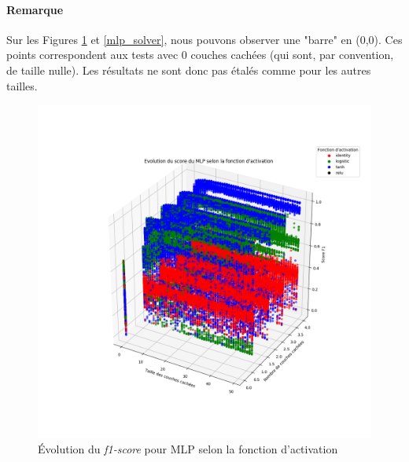 \documentclass[a4paper]{report}
\begin{document}
\paragraph{Remarque} Sur les Figures \ref{mlp_activation} et \ref{mlp_solver}, nous pouvons observer une "barre" en (0,0). Ces points correspondent aux tests avec 0 couches cachées (qui sont, par convention, de taille nulle). Les résultats ne sont donc pas étalés comme pour les autres tailles.

\begin{figure}
\centering
\includegraphics[width=\textwidth]{img/mlp_activation.png}
\caption{Évolution du \emph{f1-score} pour MLP selon la fonction d'activation\label{mlp_activation}}
\end{figure}
\end{document}
